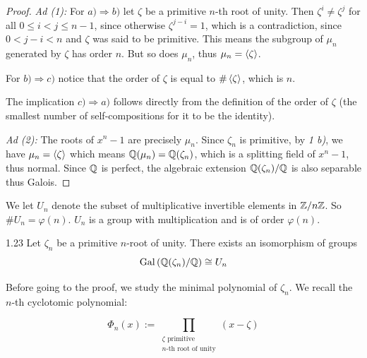 \documentclass[twoside = false,	%
		headsepline,		%
		parskip = true,
		]{scrbook}						%
\begin{document}
        \begin{proof}
            
            \textit{Ad (1):}
            For $a) \Rightarrow b)$ let $\zeta$ be a primitive $n$-th root of unity. Then $\zeta^i \neq \zeta^j$ for all $0 \leq i < j \leq n-1$, since otherwise $\zeta^{j - i} = 1$, which is a contradiction, since $0 < j - i < n$ and $\zeta$ was said to be primitive. This means the subgroup of $\mu_n$ generated by $\zeta$ has order $n$. But so does $\mu_n$, thus $\mu_n = \left\langle \zeta\right\rangle$.
            
            For $b) \Rightarrow c)$ notice that the order of $\zeta$ is equal to $\#\left\langle \zeta\right\rangle$, which is $n$.
            
            The implication $c) \Rightarrow a)$ follows directly from the definition of the order of $\zeta$ (the smallest number of self-compositions for it to be the identity).
            
            \textit{Ad (2):}
            The roots of $x^n - 1$ are precisely $\mu_n$. Since $\zeta_n$ is primitive, by \textit{1 b)}, we have $\mu_n = \left\langle \zeta\right\rangle$ which means $\mathbb Q(\mu_n) = \mathbb Q(\zeta_n)$, which is a splitting field of $x^n - 1$, thus normal. Since $\mathbb Q$ is perfect, the algebraic extension $\mathbb Q(\zeta_n)/\mathbb Q$ is also separable thus Galois.
            
        \end{proof}
        
        We let $U_n$ denote the subset of multiplicative invertible elements in $\mathbb Z/n\mathbb Z$. So $\# U_n = \varphi(n)$. $U_n$ is a group with multiplication and is of order $\varphi(n)$.
        
        \begin{proposition}{}{1.23}
            Let $\zeta_n$ be a primitive $n$-root of unity. There exists an isomorphism of groups
            \begin{equation*}
                \mathrm{Gal}\left( \mathbb Q(\zeta_n)/\mathbb Q\right) \cong U_n
            \end{equation*}
        \end{proposition}
        
        Before going to the proof, we study the minimal polynomial of $\zeta_n$. We recall the $n$-th cyclotomic polynomial:
        
        \begin{equation*}
            \Phi_n(x) := \prod_{ \begin{array}{c}
                 \zeta \text{ primitive }  \\
                 n \text{-th root of unity} 
            \end{array}
            } (x-\zeta) 
        \end{equation*}
        
\end{document}
